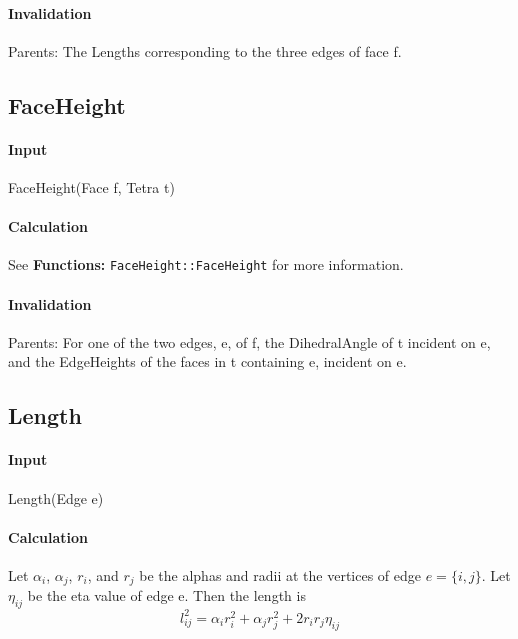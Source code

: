 \paragraph{Invalidation}

\bigskip Parents: The Lengths corresponding to the three edges of face f.

\subsection{FaceHeight}

\paragraph{Input}

FaceHeight(Face f, Tetra t)

\paragraph{Calculation}

See \textbf{Functions: }\texttt{FaceHeight::FaceHeight} for more information.

\paragraph{Invalidation}

\bigskip Parents: For one of the two edges, e, of f, the DihedralAngle of t
incident on e, and the EdgeHeights of the faces in t containing e, incident
on e.

\subsection{Length}

\paragraph{Input}

Length(Edge e)

\paragraph{Calculation}

Let $\alpha _{i}$, $\alpha _{j}$, $r_{i}$, and $r_{j}$ be the alphas and
radii at the vertices of edge $e=\{i,j\}$. Let $\eta _{ij}$ be the eta value
of edge e. Then the length is 
\begin{equation*}
l_{ij}^{2}=\alpha _{i}r_{i}^{2}+\alpha _{j}r_{j}^{2}+2r_{i}r_{j}\eta _{ij}
\end{equation*}

